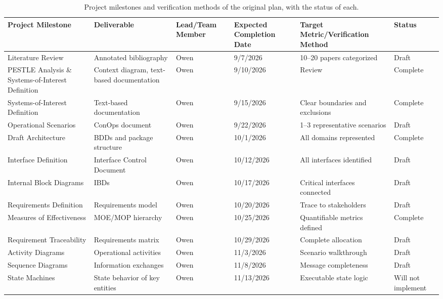 \begin{table}[htbp]
\centering
\small
\caption{Project milestones and verification methods of the original plan, with the status of each.}
\label{tab:project-timing}
\begin{tabular}{|p{}|p{}|p{}|p{}|p{}|p{}|}
\hline
\textbf{Project Milestone} & \textbf{Deliverable} & \textbf{Lead/Team Member} & \textbf{Expected Completion Date} & \textbf{Target Metric/Verification Method} & \textbf{Status} \\
\hline
Literature Review & Annotated bibliography & Owen & 9/7/2026 & 10--20 papers categorized & Draft \\
\hline
PESTLE Analysis \& Systems-of-Interest Definition & Context diagram, text-based documentation & Owen & 9/10/2026 & Review & Complete \\
\hline
Systems-of-Interest Definition & Text-based documentation & Owen & 9/15/2026 & Clear boundaries and exclusions & Complete \\
\hline
Operational Scenarios & ConOps document & Owen & 9/22/2026 & 1--3 representative scenarios & Draft \\
\hline
Draft Architecture & BDDs and package structure & Owen & 10/1/2026 & All domains represented & Complete \\
\hline
Interface Definition & Interface Control Document & Owen & 10/12/2026 & All interfaces identified & Draft \\
\hline
Internal Block Diagrams & IBDs & Owen & 10/17/2026 & Critical interfaces connected & Draft \\
\hline
Requirements Definition & Requirements model & Owen & 10/20/2026 & Trace to stakeholders & Draft \\
\hline
Measures of Effectiveness & MOE/MOP hierarchy & Owen & 10/25/2026 & Quantifiable metrics defined & Complete \\
\hline
Requirement Traceability & Requirements matrix & Owen & 10/29/2026 & Complete allocation & Draft \\
\hline
Activity Diagrams & Operational activities & Owen & 11/3/2026 & Scenario walkthrough & Draft \\
\hline
Sequence Diagrams & Information exchanges & Owen & 11/8/2026 & Message completeness & Draft \\
\hline
State Machines & State behavior of key entities & Owen & 11/13/2026 & Executable state logic & Will not implement \\

\end{tabular}
\end{table}
